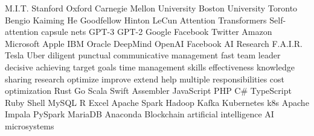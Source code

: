 \documentclass[11pt]{article}
\newlength\cvMargin
\newlength\cvSideWidth
\newlength\cvSideBar
\newlength\cvTopHeight
\newlength\cvTopHeightMargin
\begin{document}
  \par\vspace*{\fill}
  \begin{minipage}{\cvSideBar-1cm}
    \textcolor{sidebar}{
      M.I.T. Stanford Oxford Carnegie Mellon University Boston University
      Toronto
      Bengio Kaiming He Goodfellow Hinton LeCun
      Attention Transformers Self-attention capsule nets GPT-3 GPT-2
      Google Facebook Twitter
      Amazon Microsoft Apple IBM Oracle DeepMind OpenAI Facebook AI Research
      F.A.I.R. Tesla Uber
      diligent punctual communicative management fast team leader
      decisive achieving target goals time management skills
      effectiveness knowledge sharing
      research optimize improve extend help multiple responsibilities
      cost optimization
      Rust Go Scala Swift Assembler JavaScript PHP C\# TypeScript Ruby
      Shell MySQL R Excel
      Apache Spark Hadoop Kafka Kubernetes k8s Apache Impala PySpark
      MariaDB Anaconda
      Blockchain artificial intelligence AI microsystems
    }
  \end{minipage}
  \par\vspace*{\fill}

\end{document}
